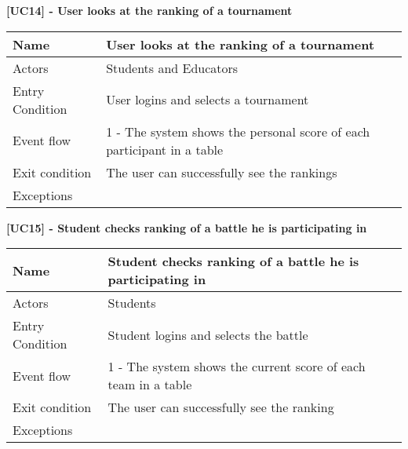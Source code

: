    \begin{table}[]
    \textbf{[UC14] - User looks at the ranking of a tournament}
    
      \centering
      \begin{tabular}{|p{3cm}|p{14cm}|}
        \hline
         Name & User looks at the ranking of a tournament \\
        \hline
        Actors & Students and Educators  \\
        \hline
        Entry Condition & User logins and selects a tournament \\
        \hline
        Event flow &  1 - The system shows the personal score of each participant in a table
        \\
        \hline
        Exit condition & The user can successfully see the rankings \\
        \hline
        Exceptions &
        \\
        \hline
      \end{tabular}
      
    \end{table}

    \begin{table}[]
    \textbf{[UC15] - Student checks ranking of a battle he is participating in}
    
      \centering
      \begin{tabular}{|p{3cm}|p{14cm}|}
        \hline
         Name & Student checks ranking of a battle he is participating in \\
        \hline
        Actors & Students \\
        \hline
        Entry Condition & Student logins and selects the battle \\
        \hline
        Event flow &  1 - The system shows the current score of each team in a table
        \\
        \hline
        Exit condition & The user can successfully see the ranking \\
        \hline
        Exceptions &
        \\
        \hline
      \end{tabular}
      
    \end{table}

